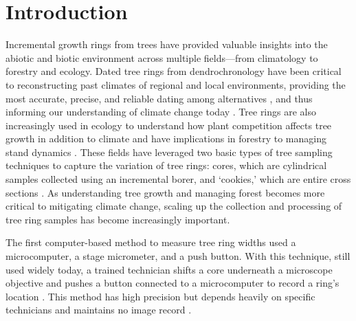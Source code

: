 \documentclass[a4paper,12pt]{article}
\begin{document}
\section{Introduction} %
Incremental growth rings from trees have provided valuable insights into the abiotic and biotic environment across multiple fields---from climatology to forestry and ecology. Dated tree rings from dendrochronology have been critical to
reconstructing past climates of regional and local environments, providing the most accurate, precise, and reliable dating among alternatives \citep{mann_northern_1999}, and thus informing  our understanding of climate change today \citep{fritts_dendroclimatology_1971,williams_using_2010,guibal_dendrochronology_2021,sheppard_dendroclimatology_2010}. Tree rings are also increasingly used in ecology to understand how plant competition affects tree growth in addition to climate \citep{buechling_climate_2017} and have implications in forestry to managing stand dynamics \citep{canham_neighborhood_2004}. These fields have leveraged two basic types of tree sampling techniques to capture the variation of tree rings: cores, which are cylindrical samples collected using an incremental borer, and `cookies,' which are entire cross sections \citep[and thus allow measuring as many radii from the sample as desired,][]{speer_fundamentals_2010}. As understanding tree growth and managing forest becomes more critical to mitigating climate change, scaling up the collection and processing of tree ring samples has become increasingly important. 

The first computer-based method to measure tree ring widths used a microcomputer, a stage micrometer, and a push button. With this technique, still used widely today, a trained technician shifts a core underneath a microscope objective and pushes a button connected to a microcomputer to record a ring's location \citep{robinson_microcomputer_1980}. %
This method has high precision but depends heavily on specific technicians and maintains no image record \citep{levanic_atrics_2007}. 
\end{document}
